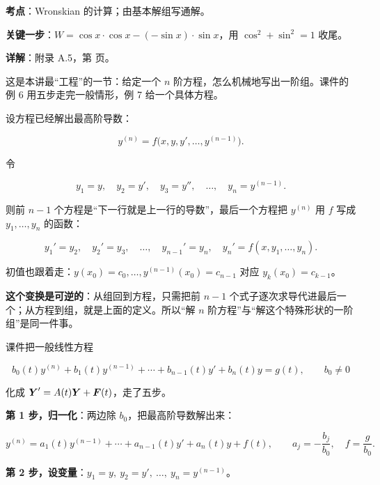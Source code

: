 \documentclass[11pt]{ctexart}
\renewcommand{\qbreak}{\needspace{0.26\textheight}}
\begin{document}

\qbreak
{}
\par\textbf{考点}：Wronskian 的计算；由基本解组写通解。
\par\textbf{关键一步}：$W=\cos x\cdot\cos x-(-\sin x)\cdot\sin x$，用 $\cos^2+\sin^2=1$ 收尾。
\par\textbf{详解}：附录 A.5，第 \pageref{app:a5} 页。


这是本讲最“工程”的一节：给定一个 $n$ 阶方程，怎么机械地写出一阶组。课件的例 6 用五步走完一般情形，例 7 给一个具体方程。


设方程已经解出最高阶导数：

\[
y^{(n)}=f\bigl(x,y,y',\dots,y^{(n-1)}\bigr).
\]

令

\[
y_1=y,\quad y_2=y',\quad y_3=y'',\quad \dots,\quad y_n=y^{(n-1)} .
\]

则前 $n-1$ 个方程是“下一行就是上一行的导数”，最后一个方程把 $y^{(n)}$ 用 $f$ 写成 $y_1,\dots,y_n$ 的函数：

\[
y_1'=y_2,\quad y_2'=y_3,\quad\dots,\quad y_{n-1}'=y_n,\quad y_n'=f(x,y_1,\dots,y_n).
\]

初值也跟着走：$y(x_0)=c_0,\dots,y^{(n-1)}(x_0)=c_{n-1}$ 对应 $y_k(x_0)=c_{k-1}$。

\textbf{这个变换是可逆的}：从组回到方程，只需把前 $n-1$ 个式子逐次求导代进最后一个；从方程到组，就是上面的定义。所以“解 $n$ 阶方程”与“解这个特殊形状的一阶组”是同一件事。


课件把一般线性方程

\[
b_0(t)y^{(n)}+b_1(t)y^{(n-1)}+\cdots+b_{n-1}(t)y'+b_n(t)y=g(t),\qquad b_0\neq0
\]

化成 $\boldsymbol{Y}'=A(t)\boldsymbol{Y}+\boldsymbol{F}(t)$，走了五步。

\textbf{第 1 步，归一化}：两边除 $b_0$，把最高阶导数解出来：

\[
y^{(n)}=a_1(t)y^{(n-1)}+\cdots+a_{n-1}(t)y'+a_n(t)y+f(t),
\qquad a_j=-\frac{b_j}{b_0},\quad f=\frac{g}{b_0}.
\]

\textbf{第 2 步，设变量}：$y_1=y,\ y_2=y',\ \dots,\ y_n=y^{(n-1)}$。
\end{document}

